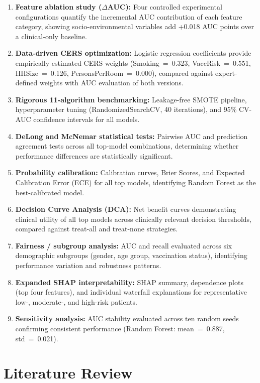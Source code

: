 \documentclass[3p,times,twocolumn]{elsarticle}
\begin{document}
\begin{enumerate}
\item \textbf{Feature ablation study (\(\Delta\)AUC):} Four controlled experimental configurations quantify the incremental AUC contribution of each feature category, showing socio-environmental variables add +0.018 AUC points over a clinical-only baseline.
\item \textbf{Data-driven CERS optimization:} Logistic regression coefficients provide empirically estimated CERS weights (Smoking~=~0.323, VaccRisk~=~0.551, HHSize~=~0.126, PersonsPerRoom~=~0.000), compared against expert-defined weights with AUC evaluation of both versions.
\item \textbf{Rigorous 11-algorithm benchmarking:} Leakage-free SMOTE pipeline, hyperparameter tuning (RandomizedSearchCV, 40 iterations), and 95\% CV-AUC confidence intervals for all models.
\item \textbf{DeLong and McNemar statistical tests:} Pairwise AUC and prediction agreement tests across all top-model combinations, determining whether performance differences are statistically significant.
\item \textbf{Probability calibration:} Calibration curves, Brier Scores, and Expected Calibration Error (ECE) for all top models, identifying Random Forest as the best-calibrated model.
\item \textbf{Decision Curve Analysis (DCA):} Net benefit curves demonstrating clinical utility of all top models across clinically relevant decision thresholds, compared against treat-all and treat-none strategies.
\item \textbf{Fairness / subgroup analysis:} AUC and recall evaluated across six demographic subgroups (gender, age group, vaccination status), identifying performance variation and robustness patterns.
\item \textbf{Expanded SHAP interpretability:} SHAP summary, dependence plots (top four features), and individual waterfall explanations for representative low-, moderate-, and high-risk patients.
\item \textbf{Sensitivity analysis:} AUC stability evaluated across ten random seeds confirming consistent performance (Random Forest: mean~=~0.887, std~=~0.021).
\end{enumerate}

\section{Literature Review}
\end{document}
